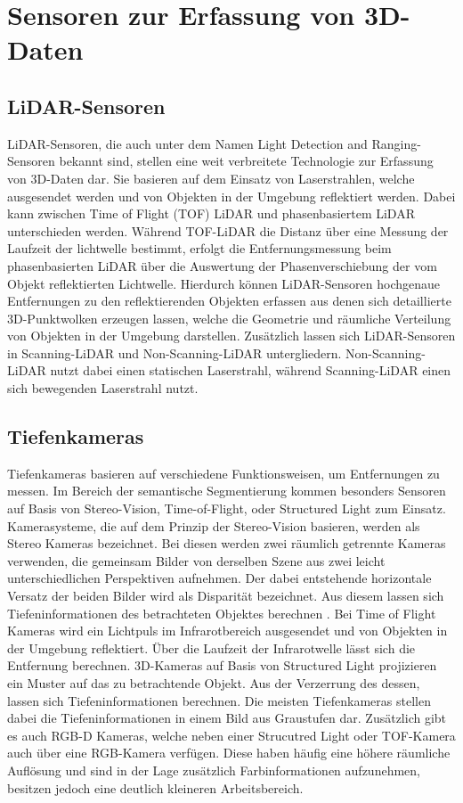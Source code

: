 \chapter{Sensoren zur Erfassung von 3D-Daten}

\section{LiDAR-Sensoren}
LiDAR-Sensoren, die auch unter dem Namen Light Detection and Ranging-Sensoren
bekannt sind, stellen eine weit verbreitete Technologie zur Erfassung von
3D-Daten dar. Sie basieren auf dem Einsatz von Laserstrahlen, welche
ausgesendet werden und von Objekten in der Umgebung reflektiert werden. Dabei
kann zwischen Time of Flight (TOF) LiDAR und phasenbasiertem LiDAR
unterschieden werden. Während TOF-LiDAR die Distanz über eine Messung der
Laufzeit der lichtwelle bestimmt, erfolgt die Entfernungsmessung beim
phasenbasierten LiDAR über die Auswertung der Phasenverschiebung der vom Objekt
reflektierten Lichtwelle. Hierdurch können LiDAR-Sensoren hochgenaue
Entfernungen zu den reflektierenden Objekten erfassen aus denen sich
detaillierte 3D-Punktwolken erzeugen lassen, welche die Geometrie und räumliche
Verteilung von Objekten in der Umgebung darstellen. Zusätzlich lassen sich
LiDAR-Sensoren in Scanning-LiDAR und Non-Scanning-LiDAR untergliedern.
Non-Scanning-LiDAR nutzt dabei einen statischen Laserstrahl, während
Scanning-LiDAR einen sich bewegenden Laserstrahl nutzt. \cite{8529992}

\section{Tiefenkameras}
Tiefenkameras basieren auf verschiedene Funktionsweisen, um Entfernungen zu
messen. Im Bereich der semantische Segmentierung kommen besonders Sensoren auf
Basis von Stereo-Vision, Time-of-Flight, oder Structured Light zum Einsatz.
Kamerasysteme, die auf dem Prinzip der Stereo-Vision basieren, werden als
Stereo Kameras bezeichnet. Bei diesen werden zwei räumlich getrennte Kameras
verwenden, die gemeinsam Bilder von derselben Szene aus zwei leicht
unterschiedlichen Perspektiven aufnehmen. Der dabei entstehende horizontale
Versatz der beiden Bilder wird als Disparität bezeichnet. Aus diesem lassen
sich Tiefeninformationen des betrachteten Objektes berechnen \cite{8932817}. Bei Time of
Flight Kameras wird ein Lichtpuls im Infrarotbereich ausgesendet und von
Objekten in der Umgebung reflektiert. Über die Laufzeit der Infrarotwelle lässt
sich die Entfernung berechnen. 3D-Kameras auf Basis von Structured Light
projizieren ein Muster auf das zu betrachtende Objekt. Aus der Verzerrung des
dessen, lassen sich Tiefeninformationen berechnen. Die meisten Tiefenkameras
stellen dabei die Tiefeninformationen in einem Bild aus Graustufen dar.
Zusätzlich gibt es auch RGB-D Kameras, welche neben einer Strucutred Light oder
TOF-Kamera auch über eine RGB-Kamera verfügen. Diese haben häufig eine höhere
räumliche Auflösung und sind in der Lage zusätzlich Farbinformationen
aufzunehmen, besitzen jedoch eine deutlich kleineren Arbeitsbereich.

